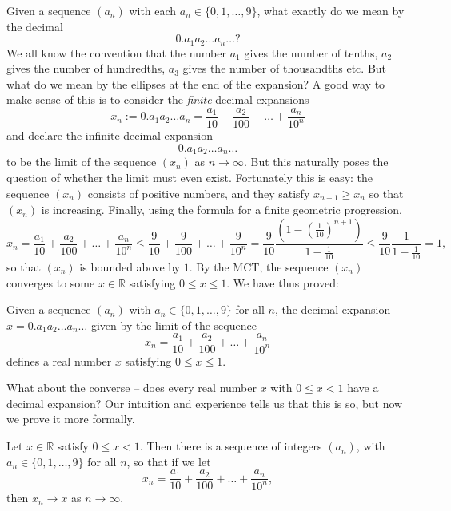 \documentclass[11pt,dvipsnames]{book}
\def\R{\mathbb{R}}
\numberwithin{figure}{section} %
\numberwithin{table}{section} %
\begin{document}
Given a sequence $(a_n)$ with each $a_n \in \{0, 1, \dots , 9\}$, what exactly do we mean by the decimal
\[ 0.a_1 a_2 \dots a_n \dots?\]
We all know the convention that the number $a_1$ gives the number of tenths, $a_2$ gives the number of hundredths,
$a_3$ gives the number of thousandths etc. But what do we mean by the ellipses at the end of the expansion? A good way to make sense of this is to consider the {\em finite} decimal expansions
\[ x_n := 0.a_1 a_2 \dots a_n = \frac{a_1}{10} + \frac{a_2}{100} + \dots + \frac{a_n}{10^n}\]
and declare the infinite decimal expansion
\[ 0.a_1 a_2 \dots a_n \dots\]
to be the limit of the sequence $(x_n)$ as $n \to \infty$. But this naturally poses the question of whether the limit must even exist. Fortunately this is easy: the sequence
$(x_n)$ consists of positive numbers, and they satisfy $x_{n+1} \geq x_n$ so that $(x_n)$ is increasing. Finally, using the formula for a finite geometric progression,
\[ x_n = \frac{a_1}{10} + \frac{a_2}{100} + \dots + \frac{a_n}{10^n} \leq \frac{9}{10} + \frac{9}{100} + \dots + \frac{9}{10^n} =  \frac{9}{10}\frac{(1 - (\frac{1}{10})^{n+1})}{1 - \frac{1}{10}} \leq \frac{9}{10}\frac{1}{1 - \frac{1}{10}}=1,\]
so that $(x_n)$ is bounded above by $1$. By the MCT, the sequence $(x_n)$ converges to some $x \in \R$ satisfying $0 \leq x \leq 1$.
We have thus proved:
\begin{theorem}
Given a sequence $(a_n)$ with $a_n \in \{0,1, \dots ,9\}$ for all $n$, the decimal expansion $ x= 0.a_1 a_2 \dots a_n \dots$ given by the limit of the sequence
\[ x_n = \frac{a_1}{10} + \frac{a_2}{100} + \dots + \frac{a_n}{10^n} \]
defines a real number $x$ satisfying $0 \leq x \leq 1$.
\end{theorem}
What about the converse -- does every real number $x$ with $0 \leq x <1$ have a decimal expansion? Our intuition and experience tells us that this is so, but now we prove it more formally.

\begin{theorem}\label{decimal_existence}
Let $x\in\mathbb{R}$ satisfy $0 \leq x <1$. Then there is a sequence of integers $(a_n)$, with $a_{n}\in \{0,1,\dots,9\}$ for all $n$, so that if we let
\[ x_n = \frac{a_1}{10} + \frac{a_2}{100} + \dots + \frac{a_n}{10^n},\]
then $x_n \to x$ as $n \to \infty$.
\end{theorem}
\end{document}
